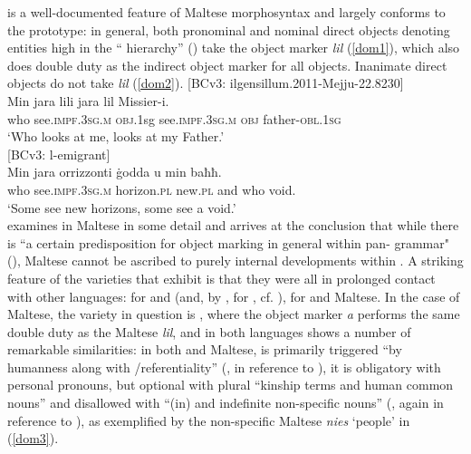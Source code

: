 \documentclass[output=paper]{langsci/langscibook}
\begin{document}
 is a well-documented feature of Maltese morphosyntax and largely conforms to the  prototype: in general, both pronominal and nominal direct objects denoting entities high in the `` hierarchy'' (\citealt[55]{BorgAzzopardi-Alexander1997}) take the object marker \textit{lil} (\ref{dom1}), which also does double duty as the indirect object marker for all objects. Inanimate direct objects do not take \textit{lil} (\ref{dom2}).
\ea\label{dom1}
{[BCv3: ilgensillum.2011-Mejju-22.8230]}\\
\gll Min jara lili jara lil Missier-i.\\
	who see.\textsc{impf.3sg.m} \textsc{obj}.1sg see.\textsc{impf.3sg.m} \textsc{obj} father-\textsc{obl.1sg}\\
	\glt `Who looks at me, looks at my Father.'\\
\ex\label{dom2}
{[BCv3: l-emigrant]}\\
\gll Min jara orrizzonti ġodda u min baħħ.\\
	who see.\textsc{impf.3sg.m} horizon.\textsc{pl} new.\textsc{pl} and who void.\\
	\glt `Some see new horizons, some see a void.'\\
\z
 \cite{dohla2016} examines  in Maltese in some detail and arrives at the conclusion that while there is ``a certain predisposition for object marking in general within pan- grammar" (\citeyear[169]{dohla2016}), Maltese  cannot be ascribed to purely internal developments within . A striking feature of the  varieties that exhibit  is that they were all in prolonged contact with other languages:  for  and   (and, by , for  , cf. \citealt[412]{Borg2004}),  for   and Maltese. In the case of Maltese, the  variety in question is , where the object marker \textit{a} performs the same double duty as the Maltese \textit{lil}, and  in both languages shows a number of remarkable similarities: in both  and Maltese,  is primarily triggered ``by humanness along with /referentiality'' (\citealt[257]{iemmolo2010}, in reference to ), it is obligatory with personal pronouns, but optional with plural ``kinship terms and human common nouns'' and disallowed with ``(in) and indefinite non-specific nouns'' (\citealt[257]{iemmolo2010}, again in reference to ), as exemplified by the non-specific Maltese \textit{nies} `people' in (\ref{dom3}).
 
\end{document}
